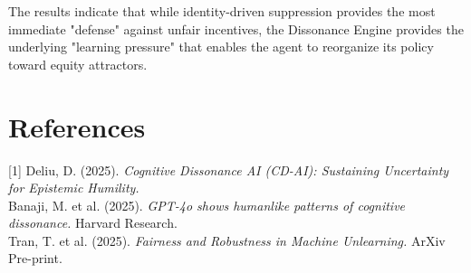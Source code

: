 \documentclass[11pt,twocolumn]{article}
\begin{document}
The results indicate that while identity-driven suppression provides the most immediate "defense" against unfair incentives, the Dissonance Engine provides the underlying "learning pressure" that enables the agent to reorganize its policy toward equity attractors.

\section*{References}
\small
[1] Deliu, D. (2025). \textit{Cognitive Dissonance AI (CD-AI): Sustaining Uncertainty for Epistemic Humility.} \\
[2] Banaji, M. et al. (2025). \textit{GPT-4o shows humanlike patterns of cognitive dissonance.} Harvard Research. \\
[3] Tran, T. et al. (2025). \textit{Fairness and Robustness in Machine Unlearning.} ArXiv Pre-print.
\end{document}
